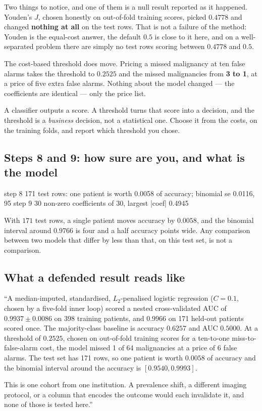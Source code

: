 \documentclass[11pt]{article}
\begin{document}
Two things to notice, and one of them is a null result reported as it
happened. Youden's $J$, chosen honestly on out-of-fold training scores,
picked $0.4778$ and changed \textbf{nothing at all} on the test rows. That is
not a failure of the method: Youden is the equal-cost answer, the default
$0.5$ is close to it here, and on a well-separated problem there are simply no
test rows scoring between $0.4778$ and $0.5$.

The cost-based threshold does move. Pricing a missed malignancy at ten false
alarms takes the threshold to $0.2525$ and the missed malignancies from
\textbf{3 to 1}, at a price of five extra false alarms. Nothing about the
model changed --- the coefficients are identical --- only the price list.

\begin{keyidea}
A classifier outputs a score. A threshold turns that score into a decision,
and the threshold is a \emph{business} decision, not a statistical one. Choose
it from the costs, on the training folds, and report which threshold you
chose.
\end{keyidea}

\subsection{Steps 8 and 9: how sure are you, and what is the model}

\begin{codeout}
step 8  171 test rows: one patient is worth 0.0058 of accuracy;
        binomial se 0.0116, 95%
step 9  30 non-zero coefficients of 30, largest |coef| 0.4945
\end{codeout}

With $171$ test rows, a single patient moves accuracy by $0.0058$, and the
binomial interval around $0.9766$ is four and a half accuracy points wide. Any
comparison between two models that differ by less than that, on this test
set, is not a comparison.

\subsection{What a defended result reads like}

\begin{worked}
``A median-imputed, standardised, $L_2$-penalised logistic regression
($C = 0.1$, chosen by a five-fold inner loop) scored a nested cross-validated
AUC of $0.9937 \pm 0.0086$ on 398 training patients, and $0.9966$ on 171
held-out patients scored once. The majority-class baseline is accuracy
$0.6257$ and AUC $0.5000$. At a threshold of $0.2525$, chosen on out-of-fold
training scores for a ten-to-one miss-to-false-alarm cost, the model missed
1 of 64 malignancies at a price of 6 false alarms. The test set has 171 rows,
so one patient is worth $0.0058$ of accuracy and the binomial interval around
the accuracy is $[0.9540, 0.9993]$.

This is one cohort from one institution. A prevalence shift, a different
imaging protocol, or a column that encodes the outcome would each invalidate
it, and none of those is tested here.''
\end{worked}
\end{document}
